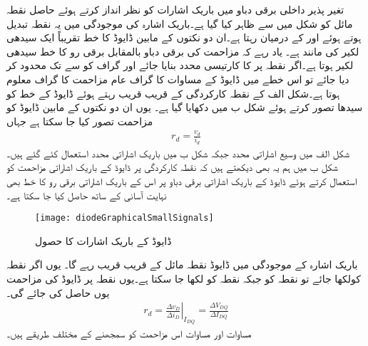 تغیر پذیر داخلی برقی دباو میں باریک اشارات کو نظر انداز کرتے ہوئے حاصل نقطہ مائل کو شکل   میں  سے ظاہر کیا گیا ہے۔باریک اشارہ کی موجودگی میں یہ نقطہ  تبدیل ہوتے ہوئے  اور  کے درمیان رہتا ہے۔ان دو نکتوں کے مابین ڈایوڈ کا خط تقریباً ایک سیدھی لکیر کی مانند ہے۔ یاد رہے کہ مزاحمت کی برقی دباو بالمقابل برقی رو کا خط سیدھی لکیر ہوتا ہے۔اگر نقطہ  پر  کا کارتیسی محدد بنایا جائے  اور گراف کو  سے  تک محدود کر دیا جائے تو اس خطے میں ڈایوڈ کے مساوات کا گراف عام مزاحمت کا گراف معلوم ہوتا ہے۔شکل  الف کے نقطہ کارکردگی   کے قریب قریب رہتے ہوئے ڈایوڈ کے خط کو سیدھا تصور کرتے ہوئے شکل  ب میں دکھایا گیا ہے۔ یوں ان دو نکتوں کے مابین ڈایوڈ کو مزاحمت  تصور کیا جا سکتا ہے جہاں 
\begin{align} \label{مساوات_ڈایوڈ_کی_مزاحمت_الف}
r_d = \frac{v_d}{i_d}
\end{align}
شکل  الف میں وسیع اشاراتی محدد  جبکہ شکل  ب میں باریک اشاراتی محدد   استعمال کئے گئے ہیں۔شکل  ب میں ہم یہ بھی دیکھتے ہیں کہ نقطہ کارکردگی پر ڈایوڈ کے باریک اشاراتی مزاحمت  کو استعمال کرتے ہوئے ڈایوڈ کے باریک اشاراتی برقی دباو  پر اس کے باریک اشاراتی برقی رو  کا خط بھی نہایت آسانی کے ساتھ حاصل کیا جا سکتا ہے۔
\begin{figure}
\centering
\texttt{[image: diodeGraphicalSmallSignals]}
\caption{ ڈایوڈ کے باریک اشارات کا حصول}
\label{شکل_ڈایوڈ_کے_باریک_اشارات_کا_حصول}
\end{figure}
باریک اشارہ کے موجودگی میں ڈایوڈ نقطہ مائل کے قریب قریب رہے گا۔ یوں اگر نقطہ  کولکھا جائے تو نقطہ  کو
جبکہ نقطہ  کو
لکھا جا سکتا ہے۔یوں نقطہ  پر ڈایوڈ کی  مزاحمت   یوں حاصل کی جائے گی۔
\begin{align} \label{مساوات_ڈایوڈ_کی_مزاحمت_ب}
r_d = \left . \frac{\Delta v_D}{\Delta i_D} \right |_{I_{DQ}}=\frac{\Delta V_{DQ}}{\Delta I_{DQ}}
\end{align}
مساوات   اور مساوات   اس مزاحمت کو سمجھنے کے مختلف طریقے ہیں۔

